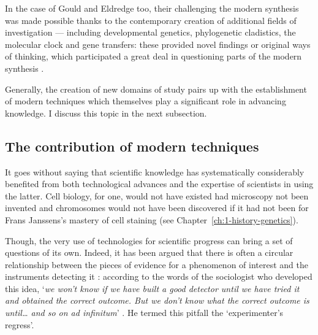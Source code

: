 

In the case of Gould and Eldredge too, their challenging the modern synthesis was made possible thanks to the contemporary creation of additional fields of investigation — including developmental genetics, phylogenetic cladistics, the molecular clock and gene transfers: these provided novel findings or original ways of thinking, which participated a great deal in questioning parts of the modern synthesis \citep{lecointre2009apres}.

Generally, the creation of new domains of study pairs up with the establishment of modern techniques which themselves play a significant role in advancing knowledge. 
I discuss this topic in the next subsection. 




\subsection{The contribution of modern techniques}

It goes without saying that scientific knowledge has systematically considerably benefited from both technological advances and the expertise of scientists in using the latter.
Cell biology, for one, would not have existed had microscopy not been invented \citep{bechtel2006discovering} and chromosomes would not have been discovered if it had not been for Frans Janssens's mastery of cell staining (see Chapter~\ref{ch:1-history-genetics}).

Though, the very use of technologies for scientific progress can bring a set of questions of its own.
Indeed, it has been argued that there is often a circular relationship between the pieces of evidence for a phenomenon of interest and the instruments detecting it \citep[reviewed in \citealp{godin2002experimenters}]{collins1975seven,collins1985changing}: 
according to the words of the sociologist who developed this idea, ‘\textit{we won't know if we have built a good detector until we have tried it and obtained the correct outcome. But we don't know what the correct outcome is until… and so on ad infinitum}’ \citep{collins1985changing}.
He termed this pitfall the ‘experimenter's regress’.

